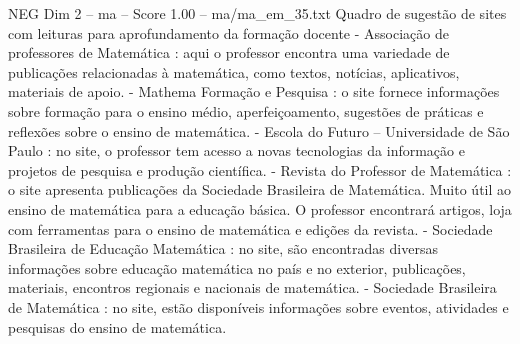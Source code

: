 \begin{textsample}{NEG Dim 2 – ma – Score 1.00 – ma/ma\_em\_35.txt}
Quadro de sugestão de sites com leituras para aprofundamento da formação docente - Associação de professores de Matemática : aqui o professor encontra uma variedade de publicações relacionadas à matemática, como textos, notícias, aplicativos, materiais de apoio. - Mathema Formação e Pesquisa : o site fornece informações sobre formação para o ensino médio, aperfeiçoamento, sugestões de práticas e reflexões sobre o ensino de matemática. - Escola do Futuro – Universidade de São Paulo : no site, o professor tem acesso a novas tecnologias da informação e projetos de pesquisa e produção científica. - Revista do Professor de Matemática : o site apresenta publicações da Sociedade Brasileira de Matemática.
Muito útil ao ensino de matemática para a educação básica.
O professor encontrará artigos, loja com ferramentas para o ensino de matemática e edições da revista. - Sociedade Brasileira de Educação Matemática : no site, são encontradas diversas informações sobre educação matemática no país e no exterior, publicações, materiais, encontros regionais e nacionais de matemática. - Sociedade Brasileira de Matemática : no site, estão disponíveis informações sobre eventos, atividades e pesquisas do ensino de matemática.

\end{textsample}
